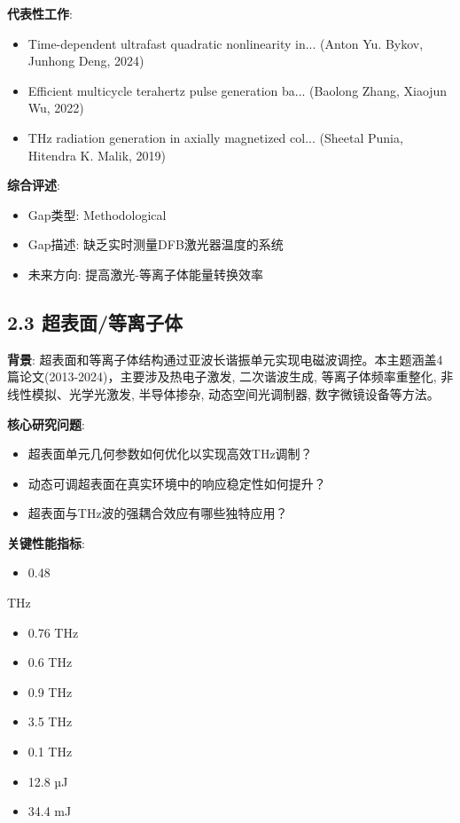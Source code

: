 \documentclass[12pt]{article}
\begin{document}
\textbf{代表性工作}:
\begin{itemize}
\item [1] Time-dependent ultrafast quadratic nonlinearity in... (Anton Yu. Bykov, Junhong Deng, 2024)
\item [2] Efficient multicycle terahertz pulse generation ba... (Baolong Zhang, Xiaojun Wu, 2022)
\item [3] THz radiation generation in axially magnetized col... (Sheetal Punia, Hitendra K. Malik, 2019)
\end{itemize}

\textbf{综合评述}:
\begin{itemize}
\item Gap类型: Methodological
\item Gap描述: 缺乏实时测量DFB激光器温度的系统
\item 未来方向: 提高激光-等离子体能量转换效率
\end{itemize}


\subsection{2.3 超表面/等离子体}

\textbf{背景}: 超表面和等离子体结构通过亚波长谐振单元实现电磁波调控。本主题涵盖4篇论文(2013-2024)，主要涉及热电子激发, 二次谐波生成, 等离子体频率重整化, 非线性模拟、光学光激发, 半导体掺杂, 动态空间光调制器, 数字微镜设备等方法。

\textbf{核心研究问题}:
\begin{itemize}
\item 超表面单元几何参数如何优化以实现高效THz调制？
\item 动态可调超表面在真实环境中的响应稳定性如何提升？
\item 超表面与THz波的强耦合效应有哪些独特应用？
\end{itemize}

\textbf{关键性能指标}:
\begin{itemize}
\item 0.48
\end{itemize}
THz
\begin{itemize}
\item 0.76 THz
\item 0.6 THz
\item 0.9 THz
\item 3.5 THz
\item 0.1 THz
\item 12.8 µJ
\item 34.4 mJ
\end{itemize}
\end{document}
